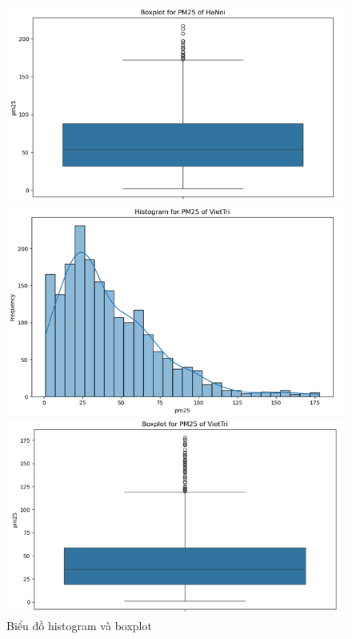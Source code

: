 \begin{figure}[H]
  \begin{minipage}{0.15\textwidth}
      \centering
      \includegraphics[width=1\textwidth]{img/final/Dataset/boxplot_hn.png}
      \end{minipage}
      \hfill
      \begin{minipage}{0.15\textwidth}
      \centering
      \includegraphics[width=1\textwidth]{img/final/Dataset/histogram_vt.png}
      \end{minipage}
      \hfill
      \begin{minipage}{0.15\textwidth}
      \centering
      \includegraphics[width=1\textwidth]{img/final/Dataset/boxplot_vt.png}
      
      \end{minipage}
      \hfill
  
  \caption{Biểu đồ histogram và boxplot}
  \label{fig:Random_Forest}
\end{figure}

